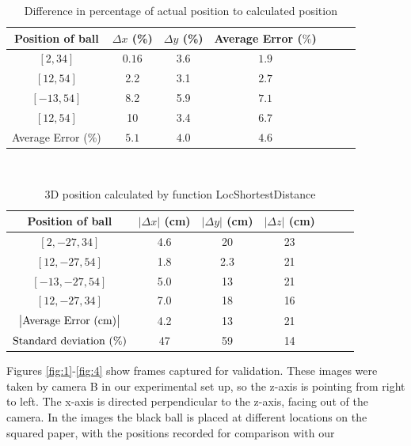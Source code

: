 \documentclass{article}
\begin{document}
\begin{table}[h!]
\centering
\begin{tabular}{c c c c c c c} 
\toprule 
Position of ball & $\Delta x$ (\%) & $\Delta y$ (\%) & Average Error ($\%$)\\[0.5ex] 
\midrule
$[2,34]$ &  $0.16$ & 3.6 & $1.9$\\
$[12, 54]$  & 2.2 & 3.1 & $2.7$\\
$[-13, 54]$ & 8.2 & 5.9 & $7.1$\\
$[12, 54]$ & 10 & 3.4 & $6.7$\\

\midrule
\midrule

Average Error (\%) &  $5.1$ & $4.0$ & $4.6$\\
\end{tabular}
\caption{Difference in percentage of actual position to calculated position}
\label{tab:2D}
\end{table}

$ $

\begin{table}[h!]
\centering
\begin{tabular}{c c c c c c c} 
\toprule 
Position of ball & $\left| \Delta x \right|$ (cm) & $\left| \Delta y  \right|$ (cm) & $\left| \Delta z\right|$ (cm)\\[0.5ex] 
\midrule
$[2, -27, 34]$ &  4.6 & 20 & 23 \\
$[12, -27, 54]$  & 1.8  & 2.3 & 21\\
$[-13, -27, 54]$ & 5.0  & 13 & 21\\
$[12, -27, 34]$ & 7.0  & 18 & 16\\
\midrule
\midrule

$\left| \textnormal{Average Error (cm)} \right|$  & 4.2 & 13 & 21\\
[0.8ex]
$\textnormal{Standard deviation (\%)} $  & 47 & 59 &	14

 
\end{tabular}
\caption{3D position calculated by function LocShortestDistance}
\label{tab:3D}
\end{table}

Figures \ref{fig:1}-\ref{fig:4} show frames captured for validation. These images were taken by camera B in our experimental set up, so the z-axis is pointing from right to left. The x-axis is directed perpendicular to the z-axis, facing out of the camera. In the images the black ball is placed at different locations on the squared paper, with the positions recorded for comparison with our 
\end{document}
